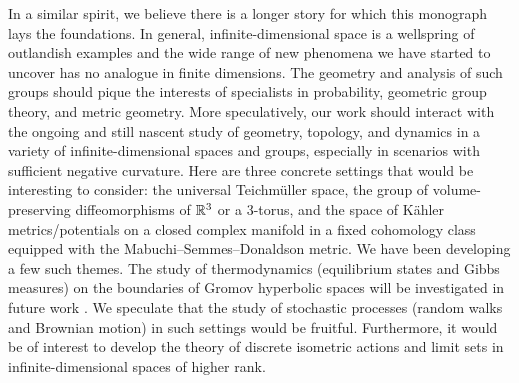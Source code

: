 
In a similar spirit, we believe there is a longer story for which this monograph lays the foundations. In general, infinite-dimensional space is a wellspring of outlandish examples and the wide range of new phenomena we have started to uncover has no analogue in finite dimensions. The geometry and analysis of such groups should pique the interests of specialists in probability, geometric group theory, and metric geometry. More speculatively, our work should interact with the ongoing and still nascent study of geometry, topology, and dynamics in a variety of infinite-dimensional spaces and groups, especially in scenarios with sufficient negative curvature. Here are three concrete settings that would be interesting to consider: the universal Teichm\"uller space, the group of volume-preserving diffeomorphisms of $\R^3$ or a $3$-torus, and the space of K\"ahler metrics/potentials on a closed complex manifold in a fixed cohomology class equipped with the Mabuchi--Semmes--Donaldson metric. We have been developing a few such themes. The study of thermodynamics (equilibrium states and Gibbs measures) on the boundaries of Gromov hyperbolic spaces will be investigated in future work \cite{DSU2}.  We speculate that the study of stochastic processes (random walks and Brownian motion) in such settings would be fruitful. Furthermore, it would be of interest to develop the theory of discrete isometric actions and limit sets in infinite-dimensional spaces of higher rank.

